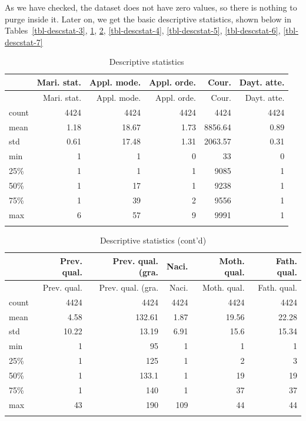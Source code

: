 \documentclass[
  letterpaper,
  DIV=11,
  numbers=noendperiod]{scrartcl}
\begin{document}
As we have checked, the dataset does not have zero values, so there is
nothing to purge inside it. Later on, we get the basic descriptive
statistics, shown below in\\
Tables~\ref{tbl-descstat-3}, \ref{tbl-descstat-1}, \ref{tbl-descstat-2}, \ref{tbl-descstat-4}, \ref{tbl-descstat-5}, \ref{tbl-descstat-6}, \ref{tbl-descstat-7}

\hypertarget{tbl-descstat-1}{}
\begin{longtable}[]{@{}lrrrrr@{}}
\toprule\noalign{}
& Mari. stat. & Appl. mode. & Appl. orde. & Cour. & Dayt. atte. \\
\midrule\noalign{}
\endfirsthead
\toprule\noalign{}
& Mari. stat. & Appl. mode. & Appl. orde. & Cour. & Dayt. atte. \\
\midrule\noalign{}
\endhead
\bottomrule\noalign{}
\endlastfoot
count & 4424 & 4424 & 4424 & 4424 & 4424 \\
mean & 1.18 & 18.67 & 1.73 & 8856.64 & 0.89 \\
std & 0.61 & 17.48 & 1.31 & 2063.57 & 0.31 \\
min & 1 & 1 & 0 & 33 & 0 \\
25\% & 1 & 1 & 1 & 9085 & 1 \\
50\% & 1 & 17 & 1 & 9238 & 1 \\
75\% & 1 & 39 & 2 & 9556 & 1 \\
max & 6 & 57 & 9 & 9991 & 1 \\
\caption{\label{tbl-descstat-1}Descriptive statistics}\tabularnewline
\end{longtable}

\hypertarget{tbl-descstat-2}{}
\begin{longtable}[]{@{}lrrrrr@{}}
\toprule\noalign{}
& Prev. qual. & Prev. qual. (gra. & Naci. & Moth. qual. & Fath. qual. \\
\midrule\noalign{}
\endfirsthead
\toprule\noalign{}
& Prev. qual. & Prev. qual. (gra. & Naci. & Moth. qual. & Fath. qual. \\
\midrule\noalign{}
\endhead
\bottomrule\noalign{}
\endlastfoot
count & 4424 & 4424 & 4424 & 4424 & 4424 \\
mean & 4.58 & 132.61 & 1.87 & 19.56 & 22.28 \\
std & 10.22 & 13.19 & 6.91 & 15.6 & 15.34 \\
min & 1 & 95 & 1 & 1 & 1 \\
25\% & 1 & 125 & 1 & 2 & 3 \\
50\% & 1 & 133.1 & 1 & 19 & 19 \\
75\% & 1 & 140 & 1 & 37 & 37 \\
max & 43 & 190 & 109 & 44 & 44 \\
\caption{\label{tbl-descstat-2}Descriptive statistics
(cont'd)}\tabularnewline
\end{longtable}
\end{document}
